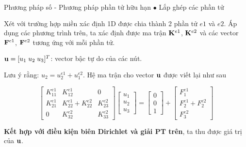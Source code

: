 \documentclass[aspectratio=169, t]{beamer} %
\begin{document}
\begin{frame}{Phương pháp số - Phương pháp phần tử hữu hạn}
\vspace{3mm}
$\bullet$ Lắp ghép các phần tử

Xét với trường hợp miền xác định 1D được chia thành 2 phần tử $e1$ và $e2$. Áp dụng các phương trình trên, ta xác định được ma trận ${\bf K}^{e1}$, ${\bf K}^{e2}$ và các vector ${\bf F}^{e1}$, ${\bf F}^{e2}$ tương ứng với mỗi phần tử.

${\bf u} = [u_1 \; u_2 \; u_3]^T$: vector bậc tự do của các nút.

Lưu ý rằng: $u_2 = u_2^{e1} + u_1^{e2}$. Hệ ma trận cho vector ${\bf u}$ được viết lại như sau

\begin{equation}
    \begin{bmatrix}
        K_{11}^{e1} & K_{12}^{e1} & 0\\
        K_{21}^{e1} & K_{22}^{e1}+K_{22}^{e2} & K_{23}^{e2} \\
        0 & K_{32}^{e2} & K_{33}^{e2}
    \end{bmatrix}\begin{bmatrix}
        u_1 \\ u_2 \\ u_3
    \end{bmatrix} = \begin{bmatrix}
        0 \\ 0 \\ 1
    \end{bmatrix} + \begin{bmatrix}
        F_1^{e1} \\ F_2^{e1}+F_2^{e2} \\ F_3^{e2}
    \end{bmatrix}
\end{equation}

\textbf{ Kết hợp với điều kiện biên Dirichlet và giải PT trên}, ta thu được giá trị của ${\bf u}$.
\cite{golub2013matrix}
\end{frame}
\end{document}
